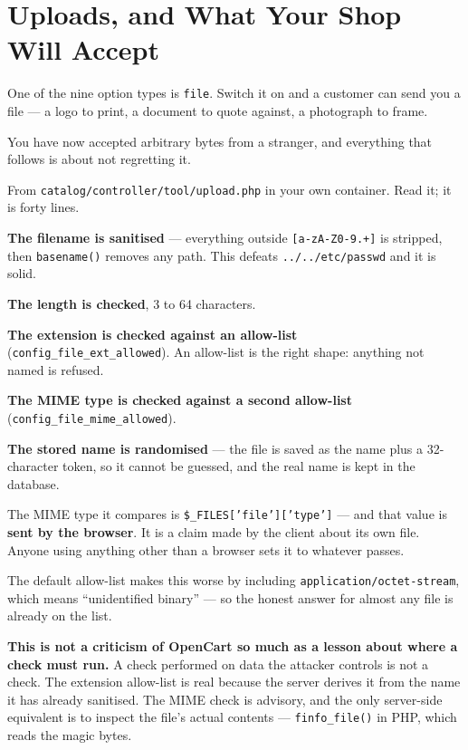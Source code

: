 \section{Uploads, and What Your Shop Will Accept}

One of the nine option types is \texttt{file}. Switch it on and a customer can
send you a file --- a logo to print, a document to quote against, a photograph
to frame.

You have now accepted arbitrary bytes from a stranger, and everything that
follows is about not regretting it.

\begin{examplebox}
From \texttt{catalog/controller/tool/upload.php} in your own container. Read
it; it is forty lines.

\begin{tightnum}
  \item \textbf{The filename is sanitised} --- everything outside
        \texttt{[a-zA-Z0-9.\-\textvisiblespace+]} is stripped, then
        \texttt{basename()} removes any path. This defeats
        \texttt{../../etc/passwd} and it is solid.
  \item \textbf{The length is checked}, 3 to 64 characters.
  \item \textbf{The extension is checked against an allow-list}
        (\texttt{config\_file\_ext\_allowed}). An allow-list is the right
        shape: anything not named is refused.
  \item \textbf{The MIME type is checked against a second allow-list}
        (\texttt{config\_file\_mime\_allowed}).
  \item \textbf{The stored name is randomised} --- the file is saved as the
        name plus a 32-character token, so it cannot be guessed, and the real
        name is kept in the database.
\end{tightnum}
\end{examplebox}

\begin{alertbox}
The MIME type it compares is
\texttt{\$\_FILES['file']['type']} --- and that value is \textbf{sent by the
browser}. It is a claim made by the client about its own file. Anyone using
anything other than a browser sets it to whatever passes.

\smallskip
The default allow-list makes this worse by including
\texttt{application/octet-stream}, which means ``unidentified binary'' ---
so the honest answer for almost any file is already on the list.

\smallskip
\textbf{This is not a criticism of OpenCart so much as a lesson about where a
check must run.} A check performed on data the attacker controls is not a
check. The extension allow-list is real because the server derives it from the
name it has already sanitised. The MIME check is advisory, and the only
server-side equivalent is to inspect the file's actual contents ---
\texttt{finfo\_file()} in PHP, which reads the magic bytes.
\end{alertbox}

